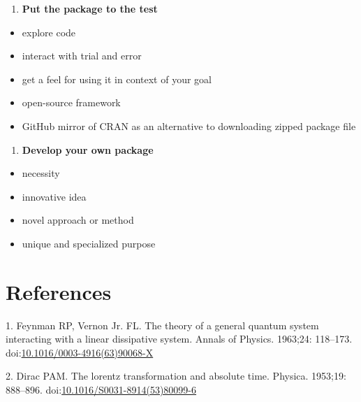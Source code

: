 \documentclass[10pt,letterpaper]{article}
\providecommand{\tightlist}{%
  \setlength{\itemsep}{0pt}\setlength{\parskip}{0pt}}
\begin{document}
\begin{enumerate}
\def\labelenumi{\arabic{enumi}.}
\setcounter{enumi}{8}
\tightlist
\item
  \textbf{Put the package to the test}
\end{enumerate}

\begin{itemize}
\tightlist
\item
  explore code
\item
  interact with trial and error
\item
  get a feel for using it in context of your goal
\item
  open-source framework
\item
  GitHub mirror of CRAN as an alternative to downloading zipped package
  file
\end{itemize}

\begin{enumerate}
\def\labelenumi{\arabic{enumi}.}
\setcounter{enumi}{9}
\tightlist
\item
  \textbf{Develop your own package}
\end{enumerate}

\begin{itemize}
\tightlist
\item
  necessity
\item
  innovative idea
\item
  novel approach or method
\item
  unique and specialized purpose
\end{itemize}

\hypertarget{references}{%
\section*{References}\label{references}}

\hypertarget{refs}{}
\leavevmode\hypertarget{ref-Feynman1963118}{}%
1. Feynman RP, Vernon Jr. FL. The theory of a general quantum system
interacting with a linear dissipative system. Annals of Physics.
1963;24: 118--173.
doi:\href{https://doi.org/10.1016/0003-4916(63)90068-X}{10.1016/0003-4916(63)90068-X}

\leavevmode\hypertarget{ref-Dirac1953888}{}%
2. Dirac PAM. The lorentz transformation and absolute time. Physica.
1953;19: 888--896.
doi:\href{https://doi.org/10.1016/S0031-8914(53)80099-6}{10.1016/S0031-8914(53)80099-6}

\nolinenumbers
\end{document}
